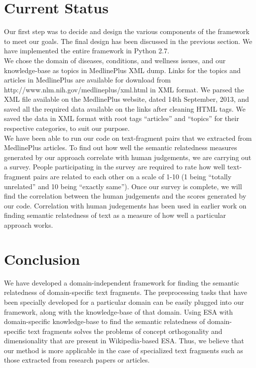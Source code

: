 \documentclass[journal,transmag]{IEEEtran}
\begin{document}

\section{\textbf{Current Status}}
Our first step was to decide and design the various components of the framework to meet our goals. The final design has been discussed in the previous section. We have implemented the entire framework in Python 2.7.\\
We chose the domain of diseases, conditions, and wellness issues, and our knowledge-base as topics in MedlinePlus XML dump. Links for the topics and articles in MedlinePlus are available for download from http://www.nlm.nih.gov/medlineplus/xml.html in XML format. We parsed the XML file available on the MedlinePlus website, dated 14th September, 2013, and saved all the required data available on the links after cleaning HTML tags. We saved the data in XML format with root tags ``articles'' and ``topics'' for their respective categories, to suit our purpose.\\
We have been able to run our code on text-fragment pairs that we extracted from MedlinePlus articles. To find out how well the semantic relatedness measures generated by our approach correlate with human judgements, we are carrying out a survey. People participating in the survey are required to rate how well text-fragment pairs are related to each other on a scale of 1-10 (1 being ``totally unrelated'' and 10 being ``exactly same''). Once our survey is complete, we will find the correlation between the human judgements and the scores generated by our code. Correlation with human judegements has been used in earlier work on finding semantic relatedness of text as a measure of how well a particular approach works.
\section{\textbf{Conclusion}}
We have developed a domain-independent framework for finding the semantic relatedness of domain-specific text fragments. The preprocessing tasks that have been specially developed for a particular domain can be easily plugged into our framework, along with the knowledge-base of that domain. Using ESA with domain-specific knowledge-base to find the semantic relatedness of domain-specific text fragments solves the problems of concept orthogonality and dimensionality that are present in Wikipedia-based ESA. Thus, we believe that our method is more applicable in the case of specialized text fragments such as those extracted from research papers or articles.
\end{document}
